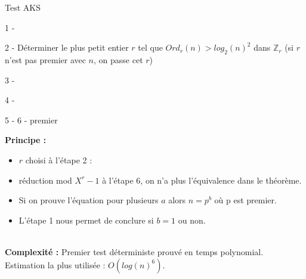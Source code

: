 			\begin{frame}
			\begin{algorithm}[H]
				\caption{Test AKS}\label{AKS}
				
				1 - 
				
				2 - Déterminer le plus petit entier $r$ tel que $Ord_{r}(n) > log_{2}(n)^{2}$ dans $\mathbb{Z}_{r}$ (si $r$ n'est pas premier avec $n$, on passe cet $r$)\;
				
				3 - 
				
				4 - 
				
				5 - 
				6 - \Retour premier\;
			\end{algorithm}
			\end{frame}
			
			\begin{frame}
				\textbf{Principe :}
				\begin{itemize}
				\item $r$ choisi à l'étape 2 :
				\item réduction mod $X^{r} - 1$ à l'étape 6, on n'a plus l'équivalence dans le théorème.
				\item Si on prouve l'équation pour plusieurs $a$ alors $n = p^{b}$ où p est premier. 
				\item L'étape 1 nous permet de conclure si $b = 1$ ou non.
				\end{itemize}
				~\\
				\textbf{Complexité :} Premier test déterministe prouvé en temps polynomial. Estimation la plus utilisée : $O(log(n)^{6})$.
			\end{frame}	
		
